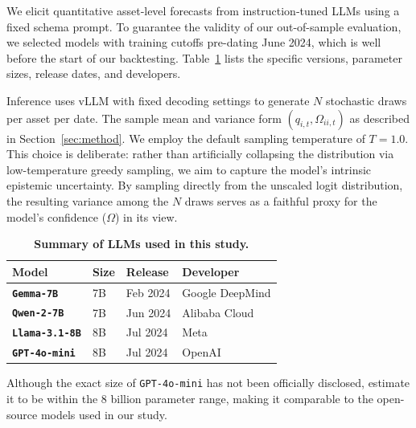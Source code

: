 We elicit quantitative asset‑level forecasts from instruction‑tuned LLMs using a fixed schema prompt. 
To guarantee the validity of our out-of-sample evaluation, we selected models with training cutoffs pre-dating June 2024, which is well before the start of our backtesting. Table~\ref{tab:llm_summary} lists the specific versions, parameter sizes, release dates, and developers.

Inference uses vLLM \citep{kwon2023efficient} with fixed decoding settings to generate $N$ stochastic draws per asset per date.
The sample mean and variance form $(q_{i,t}, \Omega_{ii,t})$ as described in Section~\ref{sec:method}.
We employ the default sampling temperature of $T=1.0$. This choice is deliberate: rather than artificially collapsing the distribution via low-temperature greedy sampling, we aim to capture the model's intrinsic epistemic uncertainty. By sampling directly from the unscaled logit distribution, the resulting variance among the $N$ draws serves as a faithful proxy for the model's confidence ($\Omega$) in its view.

\begin{table}[h]
    \centering
    \begin{threeparttable}
        \caption{\textbf{Summary of LLMs used in this study.}}
        \label{tab:llm_summary}

        \small 
        
        \renewcommand{\arraystretch}{1.2}
        \begin{tabular}{llll}
            \hline
            \textbf{Model} & \textbf{Size} & \textbf{Release} & \textbf{Developer} \\
            \hline
            \textbf{\texttt{Gemma-7B}} \cite{team2024gemma}       & 7B      & Feb 2024 & Google DeepMind \\
            \textbf{\texttt{Qwen-2-7B}} \cite{yang2024qwen2technicalreport}    & 7B      & Jun 2024 & Alibaba Cloud \\
            \textbf{\texttt{Llama-3.1-8B}} \cite{dubey2024llama}   & 8B      & Jul 2024 & Meta \\
            \textbf{\texttt{GPT-4o-mini}} \cite{openai2024gpt4o}    & 8B \tnote{a} & Jul 2024 & OpenAI \\
            \hline
        \end{tabular}
        \begin{tablenotes}
            \scriptsize
            \item[a] Although the exact size of \texttt{GPT-4o-mini} has not been officially disclosed, \cite{abacha2024medec} estimate it to be within the 8 billion parameter range, making it comparable to the open-source models used in our study.
        \end{tablenotes}
    \end{threeparttable}
\end{table}














